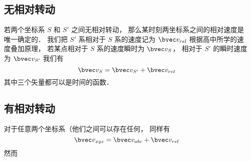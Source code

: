 

\subsection{无相对转动}
若两个坐标系 $S$ 和 $S'$ 之间无相对转动， 那么某时刻两坐标系之间的相对速度是唯一确定的． 我们把 $S'$ 系相对于 $S$ 系的速度记为 $\bvec v_{rel}$ 根据高中所学的速度叠加原理， 若某点相对于 $S$ 系的速度瞬时为 $\bvec v_S$， 相对于 $S'$ 的瞬时速度为 $\bvec v_{S'}$ 我们有
\begin{equation}
\bvec v_{S} = \bvec v_{S'} + \bvec v_{rel}
\end{equation}
其中三个矢量都可以是时间的函数．

\subsection{有相对转动}
对于任意两个坐标系（他们之间可以存在任何， 同样有
\begin{equation}
\bvec v_{xyz} = \bvec v_{abc} + \bvec v_{rel}
\end{equation}
然而
